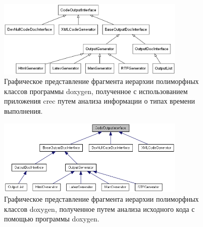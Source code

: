 

\begin{figure}[htb!]
\centering
\includegraphics[width=0.8\textwidth]{images/doxy_objtree_our.png}
\caption{Графическое представление фрагмента иерархии полиморфных классов программы doxygen, полученное с использованием приложения crec путем анализа информации о типах времени выполнения.}
\label{fig:doxy_objtree_our}
\end{figure}

\begin{figure}[htb!]
\centering
\includegraphics[width=0.8\textwidth]{images/doxy_objtree_doxy.png}
\caption{Графическое представление фрагмента иерархии полиморфных классов doxygen, полученное путем анализа исходного кода с помощью программы doxygen.}
\label{fig:doxy_objtree_doxy}
\end{figure}


